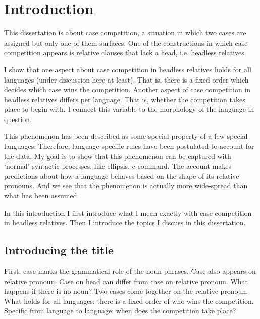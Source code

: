 
\chapter{Introduction}

This dissertation is about case competition, a situation in which two cases are assigned but only one of them surfaces. One of the constructions in which case competition appears is relative clauses that lack a head, i.e. headless relatives.

I show that one aspect about case competition in headless relatives holds for all languages (under discussion here at least). That is, there is a fixed order which decides which case wins the competition. Another aspect of case competition in headless relatives differs per language. That is, whether the competition takes place to begin with. I connect this variable to the morphology of the language in question.

This phenomenon has been described as some special property of a few special languages. Therefore, language-specific rules have been postulated to account for the data. My goal is to show that this phenomenon can be captured with `normal' syntactic processes, like ellipsis, c-command. The account makes predictions about how a language behaves based on the shape of its relative pronouns. And we see that the phenomenon is actually more wide-spread than what has been assumed.

In this introduction I first introduce what I mean exactly with case competition in headless relatives. Then I introduce the topics I discuss in this dissertation.


\section{Introducing the title}

First, case marks the grammatical role of the noun phrases. Case also appears on relative pronoun. Case on head can differ from case on relative pronoun. What happens if there is no noun? Two cases come together on the relative pronoun. What holds for all languages: there is a fixed order of who wins the competition. Specific from language to language: when does the competition take place?

